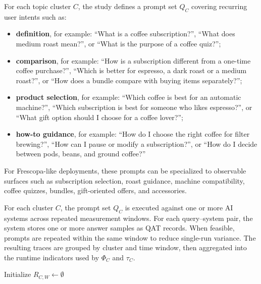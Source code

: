 \documentclass{article}
\begin{document}
For each topic cluster \(C\), the study defines a prompt set \(Q_C\) covering recurring user intents such as:
\begin{itemize}
    \item \textbf{definition}, for example: ``What is a coffee subscription?'', ``What does medium roast mean?'', or ``What is the purpose of a coffee quiz?'';
    \item \textbf{comparison}, for example: ``How is a subscription different from a one-time coffee purchase?'', ``Which is better for espresso, a dark roast or a medium roast?'', or ``How does a bundle compare with buying items separately?'';
    \item \textbf{product selection}, for example: ``Which coffee is best for an automatic machine?'', ``Which subscription is best for someone who likes espresso?'', or ``What gift option should I choose for a coffee lover?'';
    \item \textbf{how-to guidance}, for example: ``How do I choose the right coffee for filter brewing?'', ``How can I pause or modify a subscription?'', or ``How do I decide between pods, beans, and ground coffee?''
\end{itemize}

For Frescopa-like deployments, these prompts can be specialized to observable surfaces such as subscription selection, roast guidance, machine compatibility, coffee quizzes, bundles, gift-oriented offers, and accessories.

For each cluster \(C\), the prompt set \(Q_C\) is executed against one or more AI systems across repeated measurement windows. For each query--system pair, the system stores one or more answer samples as QAT records. When feasible, prompts are repeated within the same window to reduce single-run variance. The resulting traces are grouped by cluster and time window, then aggregated into the runtime indicators used by \(\Phi_C\) and \(\tau_C\).

\begin{algorithm}[H]
\caption{QAT collection for a topic cluster}

Initialize \(R_{C,W} \leftarrow \emptyset\)

\end{algorithm}
\end{document}
